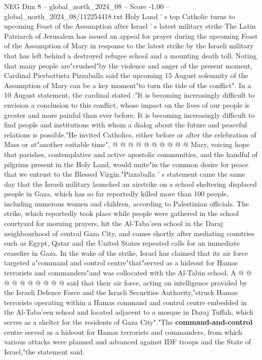 \begin{textsample}{NEG Dim 8 – global\_north\_2024\_08 – Score -1.00 – global\_north\_2024\_08/112254418.txt}  \label{ex:f8_neg_421}
Holy Land ' s top Catholic turns to upcoming Feast of the Assumption after Israel ' s latest military strike The Latin Patriarch of Jerusalem has issued an appeal for prayer during the upcoming Feast of the Assumption of Mary in response to the latest strike by the Israeli military that has left behind a destroyed refugee school and a mounting death toll.
Noting that many people are"crushed"by the violence and anger of the present moment, Cardinal Pierbattista Pizzaballa said the upcoming 15 August solemnity of the Assumption of Mary can be a key moment"to turn the tide of the conflict".
In a 10 August statement, the cardinal stated :"It is becoming increasingly difficult to envision a conclusion to this conflict, whose impact on the lives of our people is greater and more painful than ever before.
It is becoming increasingly difficult to find people and institutions with whom a dialog about the future and peaceful relations is possible."He invited Catholics, either before or after the celebration of Mass or at"another suitable time", @ @ @ @ @ @ @ @ @ @ Mary, voicing hope that parishes, contemplative and active apostolic communities, and the handful of pilgrims present in the Holy Land, would unite"in the common desire for peace that we entrust to the Blessed Virgin."Pizzaballa ' s statement came the same day that the Israeli military launched an airstrike on a school sheltering displaced people in Gaza, which has so far reportedly killed more than 100 people, including numerous women and children, according to Palestinian officials.
The strike, which reportedly took place while people were gathered in the school courtyard for morning prayers, hit the Al-Taba'een school in the Daraj neighbourhood of central Gaza City, and comes shortly after mediating countries such as Egypt, Qatar and the United States repeated calls for an immediate ceasefire in Gaza.
In the wake of the strike, Israel has claimed that its air force targeted a"command and control centre"that"served as a hideout for Hamas terrorists and commanders"and was collocated with the Al-Tabin school.
A @ @ @ @ @ @ @ @ @ @ said that their air force, acting on intelligence provided by the Israeli Defence Force and the Israeli Securities Authority,"struck Hamas terrorists operating within a Hamas command and control centre embedded in the Al-Taba'een school and located adjacent to a mosque in Daraj Tuffah, which serves as a shelter for the residents of Gaza City"."The \textbf{command-and-control} centre served as a hideout for Hamas terrorists and commanders, from which various attacks were planned and advanced against IDF troops and the State of Israel,"the statement said.

\end{textsample}
